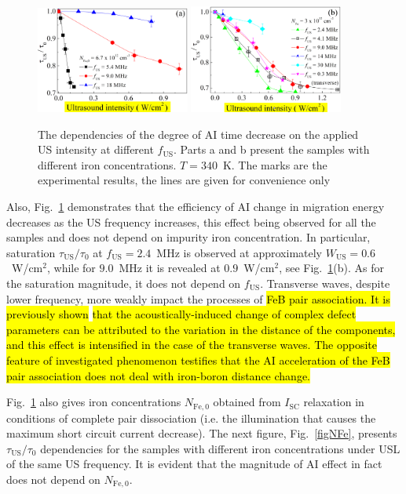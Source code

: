 \documentclass[sn-mathphys]{sn-jnl}%
\theoremstyle{thmstyleone}%
\theoremstyle{thmstyletwo}%
\theoremstyle{thmstylethree}%
\begin{document}
\begin{figure}
\centering
 \includegraphics[width=0.45\textwidth]{Fig4a}
 \includegraphics[width=0.45\textwidth]{Fig4b}
\caption{
The dependencies of the degree of AI time decrease on the applied US intensity at different $f_\mathrm{US}$.
Parts a and b present the samples with different iron concentrations.
$T=340$~K.
The marks are the experimental results, the lines are given for convenience only
}
\label{figfus}       %
\end{figure}

Also, Fig.~\ref{figfus} demonstrates that the efficiency of
AI change in migration energy decreases as the US frequency increases,
this effect being observed for all the samples and does not depend on impurity iron concentration.
In particular, saturation $\tau_\mathrm{US}/\tau_{0}$ at $f_\mathrm{US}=2.4$~MHz is observed
at approximately $W_\mathrm{US}=0.6$~W/cm$^2$,
while for $9.0$~MHz it is revealed at $0.9$~W/cm$^2$, see Fig.~\ref{figfus}(b).
As for the saturation magnitude, it does not depend on $f_\mathrm{US}$.
Transverse waves, despite lower frequency, more weakly impact the processes of \hl{FeB pair association.
It is previously shown} \cite{Olikh2018SM} \hl{that the acoustically-induced change of complex defect parameters can be attributed to the variation in the distance of the components, and this effect is intensified in the case of the transverse waves.
The opposite feature of investigated phenomenon testifies that the AI acceleration of the FeB pair
association does not deal with iron-boron distance change.}

Fig.~\ref{figfus} also gives iron concentrations $N_\mathrm{Fe,0}$ obtained from $I_\mathrm{SC}$ relaxation
in conditions of complete pair dissociation (i.e. the illumination that causes the maximum short circuit current decrease).
The next figure, Fig.~\ref{figNFe}, presents $\tau_\mathrm{US}/\tau_{0}$  dependencies
for the samples with different iron concentrations under USL of the same US frequency.
It is evident that the magnitude of AI effect in fact does not depend on $N_\mathrm{Fe,0}$.
\end{document}
